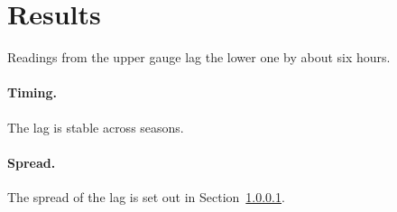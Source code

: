 \documentclass{article}
\begin{document}
\section{Results}
Readings from the upper gauge lag the lower one by about six hours.
\paragraph{Timing.}\label{sec:timing}
The lag is stable across seasons.
\paragraph{Spread.}
The spread of the lag is set out in Section~\ref{sec:timing}.
\end{document}
